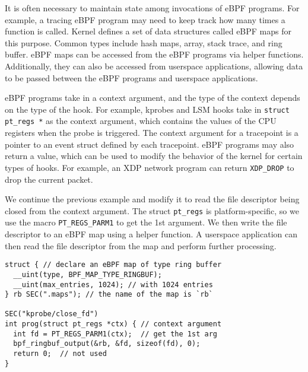 It is often necessary to maintain state among invocations of eBPF programs.
For example, a tracing eBPF program may need to keep track how many times a function is called.
Kernel defines a set of data structures called eBPF maps for this purpose.
Common types include hash maps, array, stack trace, and ring buffer.
eBPF maps can be accessed from the eBPF programs via helper functions.
Additionally, they can also be accessed from userspace applications, allowing data to be passed between the eBPF programs and userspace applications.

eBPF programs take in a context argument, and the type of the context depends on the type of the hook.
For example, kprobes and LSM hooks take in \texttt{struct pt\_regs *} as the context argument,
which contains the values of the CPU registers when the probe is triggered.
The context argument for a tracepoint is a pointer to an event struct defined by each tracepoint.
eBPF programs may also return a value, which can be used to modify the behavior of the kernel for certain types of hooks.
For example, an XDP network program can return \texttt{XDP\_DROP} to drop the current packet.

We continue the previous example and modify it to read the file descriptor being closed from the context argument.
The struct \texttt{pt\_regs} is platform-specific, so we use the macro \texttt{PT\_REGS\_PARM1} to get the 1st argument.
We then write the file descriptor to an eBPF map using a helper function.
A userspace application can then read the file descriptor from the map and perform further processing.


\begin{verbatim}
struct { // declare an eBPF map of type ring buffer
  __uint(type, BPF_MAP_TYPE_RINGBUF);
  __uint(max_entries, 1024); // with 1024 entries
} rb SEC(".maps"); // the name of the map is `rb`

SEC("kprobe/close_fd")
int prog(struct pt_regs *ctx) { // context argument
  int fd = PT_REGS_PARM1(ctx);  // get the 1st arg
  bpf_ringbuf_output(&rb, &fd, sizeof(fd), 0);
  return 0;  // not used
}
\end{verbatim}



